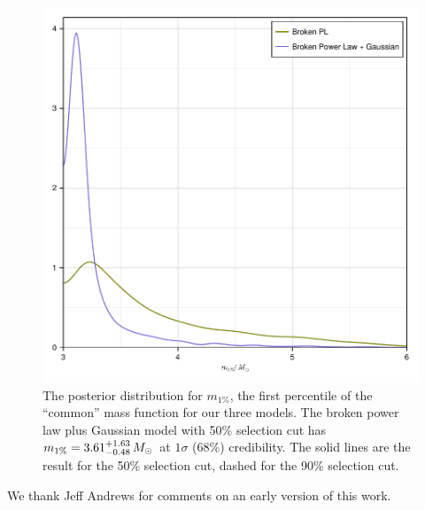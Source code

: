 \documentclass[modern]{aastex631}
\begin{document}
\begin{figure}
    \includegraphics[width=\columnwidth]{figures/m1pct_including_230529.pdf}
    \caption{\label{fig:m1pct_including_230529} The posterior distribution for $m_{1\%}$, the
    first percentile of the ``common'' mass function for our three models.  The
    broken power law plus Gaussian model with 50\% selection cut has $m_{1\%} =
    3.61^{+1.63}_{-0.48} \, M_\odot$ at $1\sigma$ (68\%) credibility.  The solid lines are
    the result for the 50\% selection cut, dashed for the 90\% selection cut.}
\end{figure}




\begin{acknowledgments}
    We thank Jeff Andrews for comments on an early version of this work.
\end{acknowledgments}


\clearpage


\end{document}
